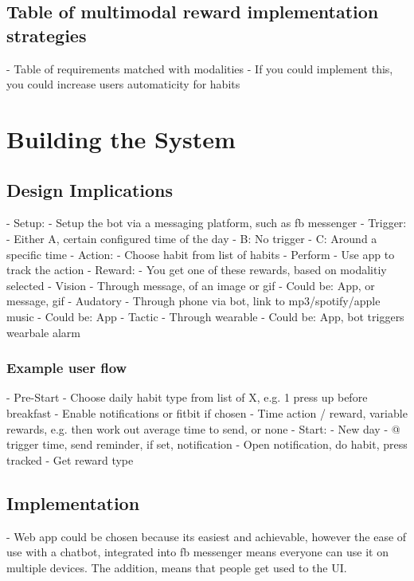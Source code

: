 \newpage
  \subsection{Table of multimodal reward implementation strategies}
    - Table of requirements matched with modalities
    - If you could implement this, you could increase users automaticity for habits

\newpage
\section{Building the System}
  \subsection{Design Implications}
    - Setup:
      - Setup the bot via a messaging platform, such as fb messenger
    - Trigger:
        - Either A, certain configured time of the day
        -        B: No trigger
        -        C: Around a specific time
    - Action:
      - Choose habit from list of habits
      - Perform
      - Use app to track the action
    - Reward:
      - You get one of these rewards, based on modalitiy selected
      - Vision
        - Through message, of an image or gif
        - Could be: App, or message, gif
      - Audatory
        - Through phone via bot, link to mp3/spotify/apple music
        - Could be: App
      - Tactic
        - Through wearable
        - Could be: App, bot triggers wearbale alarm



  \subsubsection{Example user flow}
      - Pre-Start
        - Choose daily habit type from list of X, e.g. 1 press up before breakfast
        - Enable notifications or fitbit if chosen
        - Time action / reward, variable rewards, e.g. then work out average time to send, or none
      - Start:
        - New day
        - @ trigger time, send reminder, if set, notification
        - Open notification, do habit, press tracked
        - Get reward type

\newpage
  \subsection{Implementation}
    - Web app could be chosen because its easiest and achievable, however the ease of use with a chatbot, integrated into fb messenger means everyone can use it on multiple devices. The addition, means that people get used to the UI.
